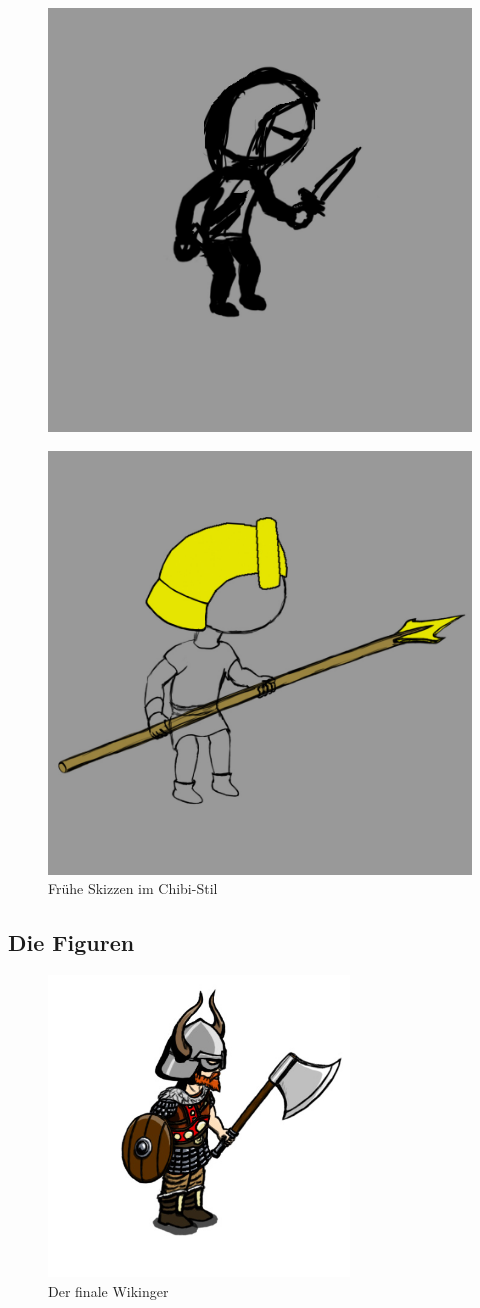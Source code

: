 \documentclass[extern,palatino]{cgBA}
\begin{document}
\begin{figure}[H]
		\centering
		\includegraphics[width=.5\textwidth]{assachibi.jpg}
\end{figure}
\begin{figure}[H]
		\centering
		\includegraphics[width=.5\textwidth]{egychibi.jpg}
		\caption{Frühe Skizzen im Chibi-Stil}
		\label{earlydesign}
\end{figure}
\newpage
\subsection{Die Figuren}
\begin{figure}[H]
		\centering
		\includegraphics[height=8cm]{viking.jpg}
		\caption{Der finale Wikinger}
		\label{viking}
\end{figure}
\end{document}
